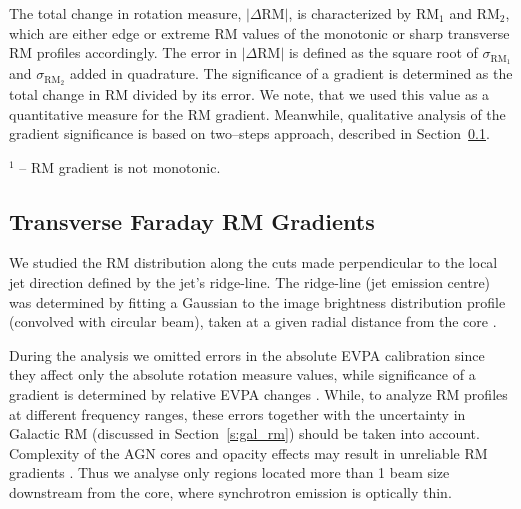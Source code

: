 \documentclass[a4paper,fleqn,usenatbib,useAMS]{mnras}
\begin{document}
\begin{table*}
\begin{minipage}{175mm}
The total change in rotation measure, $|\Delta\mathrm{RM}|$,  is characterized by ${\mathrm{RM}}_1$ and ${\mathrm{RM}}_2$, which are either edge or extreme RM values of the monotonic or sharp transverse RM profiles accordingly. The error in $|\Delta\mathrm{RM}|$ is defined as the square root of $\sigma_{\mathrm{RM}_1}$ and $\sigma_{\mathrm{RM}_2}$ added in quadrature. The significance of a gradient is determined as the total change in RM divided by its error. We note, that we used this value as a quantitative measure for the RM gradient. Meanwhile, qualitative analysis of the  gradient significance is based on two--steps approach, described in Section~\ref{s:trgr}.

$^\mathrm{1}$ -- RM gradient is not monotonic.
 \label{t:grads}
 \end{minipage}
\end{table*}





\subsection{Transverse Faraday RM Gradients}
\label{s:trgr} 
We studied the RM distribution along the cuts made perpendicular to the local jet direction defined by the jet's ridge-line. 
The ridge-line (jet emission centre) was determined by fitting a Gaussian to the image brightness distribution profile (convolved with circular beam), taken at a given radial distance from the core \citep[see description of the technique in, e.g.][]{lobanov_zensus_01}.

During the analysis we omitted errors in the absolute EVPA calibration since they affect only the absolute rotation measure values, while significance of a gradient is determined by relative EVPA changes \citep[e.g.][]{mahmud_etal09,hovatta_etal12}. 
While, to analyze RM profiles at different frequency ranges, these errors together with the uncertainty in Galactic RM (discussed in Section~\ref{s:gal_rm}) should be taken into account.
Complexity of the AGN cores and opacity effects may result in unreliable RM gradients \citep[as, e.g. shown in simulations by][]{broderick_mckinney_10}. 
Thus we analyse only regions located more than 1 beam size downstream from the core, where synchrotron emission is optically thin.
\end{document}
